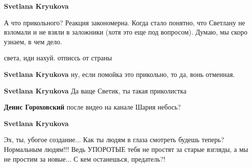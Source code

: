 \begin{itemize}
\begin{itemize}
 
\textbf{Svetlana Kryukova} 

А что прикольного? Реакция закономерна. Когда стало понятно, что Светлану не
взломали и не взяли в заложники (хотя это еще под вопросом). Думаю, мы скоро
узнаем, в чем дело.

 
света, иди нахуй. отписсь от страны

 
\textbf{Svetlana Kryukova} ну, если помойка это прикольно, то да, вонь отменная.

 
\textbf{Svetlana Kryukova} Да ваще Светик, ты такая приколистка 🤭

 
\textbf{Денис Гороховский} после видео на канале Шария небось?

 
\textbf{Svetlana Kryukova}

Эх, ты, убогое создание... Как ты людям в глаза смотреть будешь теперь?
Нормальным людям!!! Ведь УПОРОТЫЕ тебя не простят за старые взгляды, а мы не
простим за новые... С кем останешься, предатель?!


\end{itemize}
\end{itemize}
